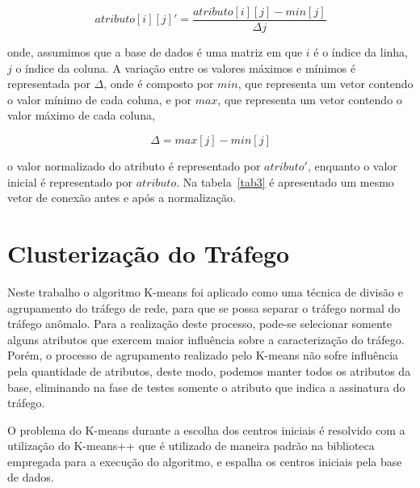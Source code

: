 \vspace{0.3cm}
\begin{equation}
\label{eq:Interpolação Linear} %
atributo[i][j]' = \frac{atributo[i][j] - min[j]}{\Delta j}
\end{equation}
\vspace{0.3cm}

\noindent onde, assumimos que a base de dados é uma matriz em que $ i $ é o índice da linha, $ j $ o índice da coluna. A variação entre os valores máximos e mínimos é representada por $ \Delta $, onde é composto por $ min $, que representa um vetor contendo o valor mínimo de cada coluna, e por  $ max $, que representa um vetor contendo o valor máximo de cada coluna,

\vspace{0.3cm}
\begin{equation}
\label{eq:Valor de Delta} %
\Delta = max[j] - min[j]
\end{equation}
\vspace{0.3cm}

\noindent o valor normalizado do atributo é representado por $ atributo' $, enquanto o valor inicial é representado por $ atributo $. Na tabela~\ref{tab3} é apresentado um mesmo vetor de conexão antes e após a normalização.


  \section{Clusterização do Tráfego}

\indent Neste trabalho o algoritmo K-means foi aplicado como uma técnica de divisão e agrupamento do tráfego de rede, para que se possa separar o tráfego normal do tráfego anômalo. Para a realização deste processo, pode-se selecionar somente alguns atributos que exercem maior influência sobre a caracterização do tráfego. Porém, o processo de agrupamento realizado pelo K-means não sofre influência pela quantidade de atributos, deste modo, podemos manter todos os atributos da base, eliminando na fase de testes somente o atributo que indica a assinatura do tráfego.

\indent O problema do K-means durante a escolha dos centros iniciais é resolvido com a utilização do K-means++ \cite{arthur2007} que é utilizado de maneira padrão na biblioteca empregada para a execução do algoritmo, e espalha os centros iniciais pela base de dados.

